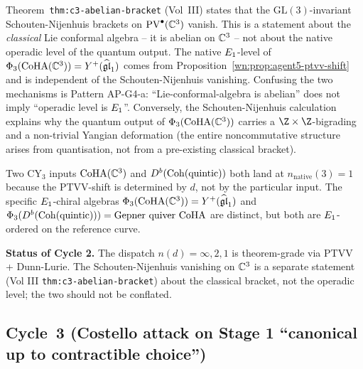 \begin{remark}
\label{wn:rem:agent5-sn-vs-operadic-level}
Theorem~\texttt{thm:c3-abelian-bracket} (Vol~III) states that the
$\mathrm{GL}(3)$-invariant Schouten-Nijenhuis brackets on
$\mathrm{PV}^\bullet(\mathbb{C}^3)$ vanish. This is a statement about the
\emph{classical} Lie conformal algebra -- it is abelian on $\mathbb{C}^3$ --
not about the native operadic level of the quantum output. The native
$E_1$-level of $\Phi_3(\mathrm{CoHA}(\mathbb{C}^3)) = Y^+(\widehat{\mathfrak{gl}}_1)$ comes
from Proposition~\ref{wn:prop:agent5-ptvv-shift} and is independent of
the Schouten-Nijenhuis vanishing. Confusing the two mechanisms is
Pattern AP-G4-a: ``Lie-conformal-algebra is abelian'' does not imply
``operadic level is $E_1$''. Conversely, the Schouten-Nijenhuis
calculation explains why the quantum output of $\Phi_3(\mathrm{CoHA}(\mathbb{C}^3))$
carries a $\Z \times \Z$-bigrading and a non-trivial Yangian
deformation (the entire noncommutative structure arises from
quantisation, not from a pre-existing classical bracket).
\end{remark}

\begin{remark}
\label{wn:rem:agent5-per-input-uniformity}
Two CY$_3$ inputs $\mathrm{CoHA}(\mathbb{C}^3)$ and $D^b(\mathrm{Coh}(\text{quintic}))$ both
land at $n_{\mathrm{native}}(3) = 1$ because the PTVV-shift is
determined by $d$, not by the particular input. The specific
$E_1$-chiral algebras $\Phi_3(\mathrm{CoHA}(\mathbb{C}^3)) = Y^+(\widehat{\mathfrak{gl}}_1)$
and $\Phi_3(D^b(\mathrm{Coh}(\text{quintic}))) = \text{Gepner quiver CoHA}$ are
distinct, but both are $E_1$-ordered on the reference curve.
\end{remark}

\medskip
\noindent\textbf{Status of Cycle 2.} The dispatch $n(d) = \infty, 2, 1$
is theorem-grade via PTVV + Dunn-Lurie. The Schouten-Nijenhuis
vanishing on $\mathbb{C}^3$ is a separate statement (Vol III
\texttt{thm:c3-abelian-bracket}) about the classical bracket, not the
operadic level; the two should not be conflated.

\subsection*{Cycle~3 (Costello attack on Stage 1 ``canonical up to contractible choice'')}

